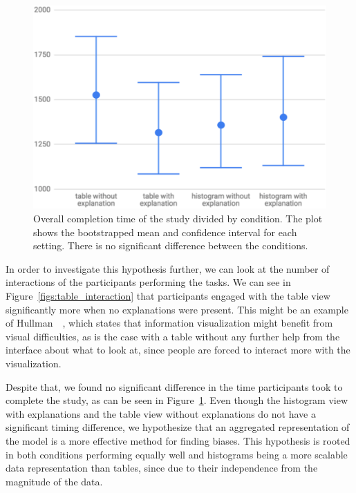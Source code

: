 \begin{figure}[b]
\centering
\includegraphics[width=0.6\linewidth]{aggexplain/timing2}
\caption{
Overall completion time of the study divided by condition.
The plot shows the bootstrapped mean and confidence interval for each setting.
There is no significant difference between the conditions.
}
\label{figs:timing}
\end{figure}

In order to investigate this hypothesis further, we can look at the number of interactions of the participants performing the tasks.
We can see in Figure~\ref{figs:table_interaction} that participants engaged with the table view significantly more when no explanations were present.
This might be an example of Hullman~\etal~\cite{6064986}, which states that information visualization might benefit from visual difficulties, as is the case with a table without any further help from the interface about what to look at, since people are forced to interact more with the visualization.


Despite that, we found no significant difference in the time participants took to complete the study, as can be seen in Figure~\ref{figs:timing}.
Even though the histogram view with explanations and the table view without explanations do not have a significant timing difference, we hypothesize that an aggregated representation of the model is a more effective method for finding biases.
This hypothesis is rooted in both conditions performing equally well and histograms being a more scalable data representation than tables, since due to their independence from the magnitude of the data.

